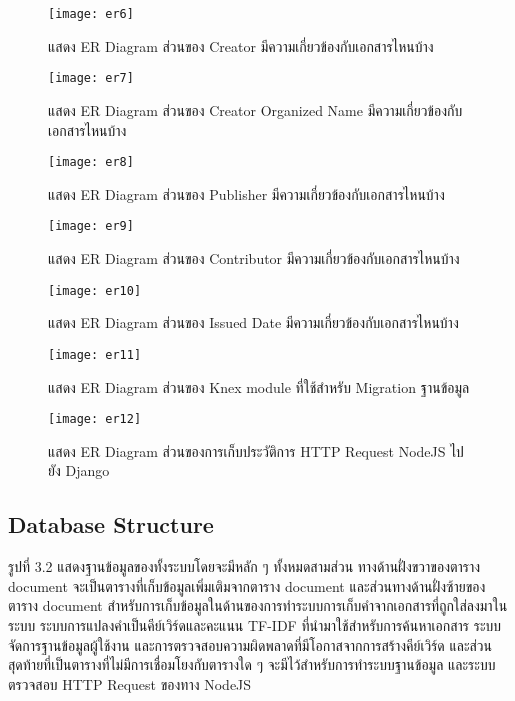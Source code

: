 \begin{figure}[H]
    \centering
    \texttt{[image: er6]}
    \caption{แสดง ER Diagram ส่วนของ Creator มีความเกี่ยวข้องกับเอกสารไหนบ้าง}\label{fig:er6}
\end{figure}



\begin{figure}[H]
    \centering
    \texttt{[image: er7]}
    \caption{แสดง ER Diagram ส่วนของ Creator Organized Name มีความเกี่ยวข้องกับเอกสารไหนบ้าง}\label{fig:er7}
\end{figure}



\begin{figure}[H]
    \centering
    \texttt{[image: er8]}
    \caption{แสดง ER Diagram ส่วนของ Publisher มีความเกี่ยวข้องกับเอกสารไหนบ้าง}\label{fig:er8}
\end{figure}



\begin{figure}[H]
    \centering
    \texttt{[image: er9]}
    \caption{แสดง ER Diagram ส่วนของ Contributor มีความเกี่ยวข้องกับเอกสารไหนบ้าง}\label{fig:er9}
\end{figure}



\begin{figure}[H]
    \centering
    \texttt{[image: er10]}
    \caption{แสดง ER Diagram ส่วนของ Issued Date มีความเกี่ยวข้องกับเอกสารไหนบ้าง}\label{fig:er10}
\end{figure}



\begin{figure}[H]
    \centering
    \texttt{[image: er11]}
    \caption{แสดง ER Diagram ส่วนของ Knex module ที่ใช้สำหรับ Migration ฐานข้อมูล}\label{fig:er11}
\end{figure}



\begin{figure}[H]
    \centering
    \texttt{[image: er12]}
    \caption{แสดง ER Diagram ส่วนของการเก็บประวัติการ HTTP Request NodeJS ไปยัง Django}\label{fig:er12}
\end{figure}

\subsection{Database Structure}
รูปที่ 3.2 แสดงฐานข้อมูลของทั้งระบบโดยจะมีหลัก ๆ ทั้งหมดสามส่วน ทางด้านฝั่งขวาของตาราง document จะเป็นตารางที่เก็บข้อมูลเพิ่มเติมจากตาราง document และส่วนทางด้านฝั่งซ้ายของตาราง document สำหรับการเก็บข้อมูลในด้านของการทำระบบการเก็บคำจากเอกสารที่ถูกใส่ลงมาในระบบ ระบบการแปลงคำเป็นคีย์เวิร์ดและคะแนน TF-IDF ที่นำมาใช้สำหรับการค้นหาเอกสาร ระบบจัดการฐานข้อมูลผู้ใช้งาน และการตรวจสอบความผิดพลาดที่มีโอกาสจากการสร้างคีย์เวิร์ด และส่วนสุดท้ายที่เป็นตารางที่ไม่มีการเชื่อมโยงกับตารางใด ๆ จะมีไว้สำหรับการทำระบบฐานข้อมูล และระบบตรวจสอบ HTTP Request ของทาง NodeJS

